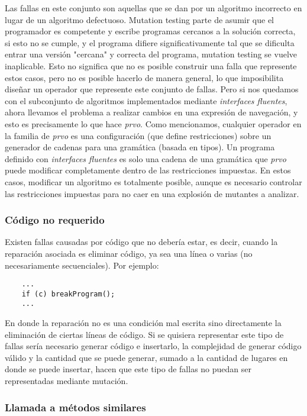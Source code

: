 Las fallas en este conjunto son aquellas que se dan por un algoritmo incorrecto en lugar de un algoritmo defectuoso. Mutation testing parte de asumir que el programador es competente y escribe programas cercanos a la soluci\'on correcta, si esto no se cumple, y el programa difiere significativamente tal que se dificulta entrar una versi\'on "cercana" y correcta del programa, mutation testing se vuelve inaplicable. Esto no significa que no es posible construir una falla que represente estos casos, pero no es posible hacerlo de manera general, lo que imposibilita dise\~nar un operador que represente este conjunto de fallas. Pero si nos quedamos con el subconjunto de algoritmos implementados mediante \emph{interfaces fluentes}, ahora llevamos el problema a realizar cambios en una expresi\'on de navegaci\'on, y esto es precisamente lo que hace \emph{prvo}. Como mencionamos, cualquier operador en la familia de \emph{prvo} es una configuraci\'on (que define restricciones) sobre un generador de cadenas para una gram\'atica (basada en tipos). Un programa definido con \emph{interfaces fluentes} es solo una cadena de una gram\'atica que \emph{prvo} puede modificar completamente dentro de las restricciones impuestas. En estos casos, modificar un algoritmo es totalmente posible, aunque es necesario controlar las restricciones impuestas para no caer en una explosi\'on de mutantes a analizar.

\subsubsection{C\'odigo no requerido} %

Existen fallas causadas por c\'odigo que no deber\'ia estar, es decir, cuando la reparaci\'on asociada es eliminar c\'odigo, ya sea una l\'inea o varias (no necesariamente secuenciales). Por ejemplo:
\begin{lstlisting}
	...
	if (c) breakProgram();
	...
\end{lstlisting}
En donde la reparaci\'on no es una condici\'on mal escrita sino directamente la eliminaci\'on de ciertas l\'ineas de c\'odigo. Si se quisiera representar este tipo de fallas ser\'ia necesario generar c\'odigo e insertarlo, la complejidad de generar c\'odigo v\'alido y la cantidad que se puede generar, sumado a la cantidad de lugares en donde se puede insertar, hacen que este tipo de fallas no puedan ser representadas mediante mutaci\'on.

\subsubsection{Llamada a m\'etodos similares}

